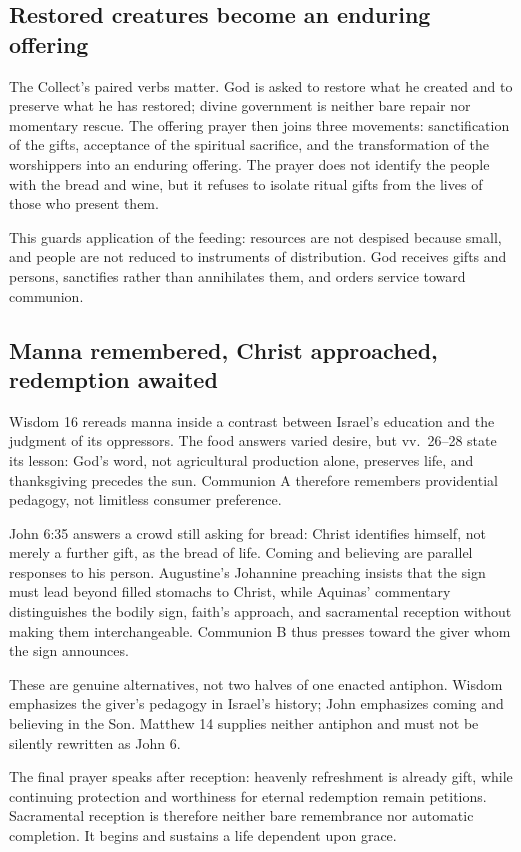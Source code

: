 \subsection*{Restored creatures become an enduring offering\enspace{}}
The Collect's paired verbs matter. God is asked to restore what he created and
to preserve what he has restored; divine government is neither bare repair
nor momentary rescue. The offering prayer then joins three movements:
sanctification of the gifts, acceptance of the spiritual sacrifice, and the
transformation of the worshippers into an enduring offering. The prayer does
not identify the people with the bread and wine, but it refuses to isolate
ritual gifts from the lives of those who present them.

This guards application of the feeding: resources are not despised because small, and people are not reduced to instruments of distribution. God receives gifts and persons, sanctifies rather than annihilates them, and orders service toward communion.

\subsection*{Manna remembered, Christ approached, redemption awaited\enspace{}}
Wisdom 16 rereads manna inside a contrast between Israel's education and the
judgment of its oppressors. The food answers varied desire, but vv.~26--28
state its lesson: God's word, not agricultural production alone, preserves
life, and thanksgiving precedes the sun. Communion A therefore remembers
providential pedagogy, not limitless consumer preference.

John 6:35 answers a crowd still asking for bread: Christ identifies himself,
not merely a further gift, as the bread of life. Coming and believing are
parallel responses to his person. Augustine's Johannine preaching insists
that the sign must lead beyond filled stomachs to Christ, while Aquinas'
commentary distinguishes the bodily sign, faith's approach, and sacramental
reception without making them interchangeable. Communion B thus presses
toward the giver whom the sign announces.

These are genuine alternatives, not two halves of one enacted antiphon.
Wisdom emphasizes the giver's pedagogy in Israel's history; John emphasizes
coming and believing in the Son. Matthew 14 supplies neither antiphon and
must not be silently rewritten as John 6.

The final prayer speaks after reception: heavenly refreshment is already gift, while continuing protection and worthiness for eternal redemption remain petitions. Sacramental reception is therefore neither bare remembrance nor automatic completion. It begins and sustains a life dependent upon grace.
